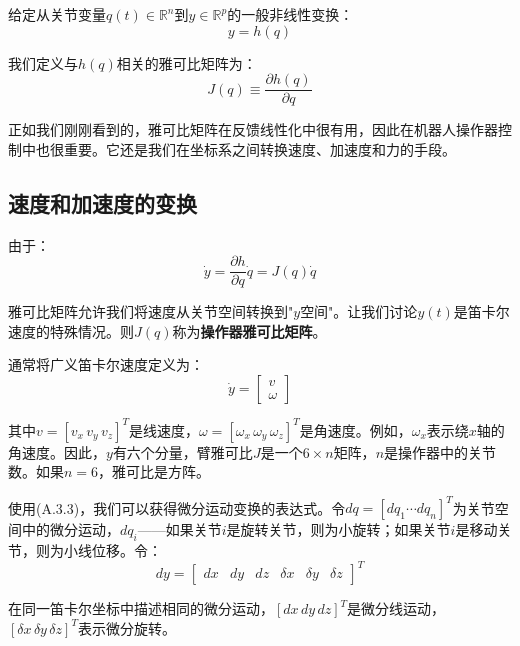 \documentclass[UTF8,a4paper]{ctexart}
\begin{document}
给定从关节变量$q(t) \in \mathbb{R}^n$到$y \in \mathbb{R}^p$的一般非线性变换：
\begin{equation}
y = h(q)
\tag{A.3.1}
\end{equation}

我们定义与$h(q)$相关的雅可比矩阵为：
\begin{equation}
J(q) \equiv \frac{\partial h(q)}{\partial q}
\tag{A.3.2}
\end{equation}

正如我们刚刚看到的，雅可比矩阵在反馈线性化中很有用，因此在机器人操作器控制中也很重要。它还是我们在坐标系之间转换速度、加速度和力的手段。

\subsection{速度和加速度的变换}

由于：
\begin{equation}
\dot{y} = \frac{\partial h}{\partial q}\dot{q} = J(q)\dot{q}
\tag{A.3.3}
\end{equation}

雅可比矩阵允许我们将速度从关节空间转换到"$y$空间"。让我们讨论$y(t)$是笛卡尔速度的特殊情况。则$J(q)$称为\textbf{操作器雅可比矩阵}。

通常将广义笛卡尔速度定义为：
\begin{equation}
\dot{y} = \begin{bmatrix} v \\ \omega \end{bmatrix}
\tag{A.3.4}
\end{equation}

其中$v = [v_x \, v_y \, v_z]^T$是线速度，$\omega = [\omega_x \, \omega_y \, \omega_z]^T$是角速度。例如，$\omega_x$表示绕$x$轴的角速度。因此，$y$有六个分量，臂雅可比$J$是一个$6 \times n$矩阵，$n$是操作器中的关节数。如果$n=6$，雅可比是方阵。

使用(A.3.3)，我们可以获得微分运动变换的表达式。令$dq = [dq_1 \cdots dq_n]^T$为关节空间中的微分运动，$dq_i$——如果关节$i$是旋转关节，则为小旋转；如果关节$i$是移动关节，则为小线位移。令：
\begin{equation}
dy = \begin{bmatrix} dx & dy & dz & \delta x & \delta y & \delta z \end{bmatrix}^T
\tag{A.3.5}
\end{equation}

在同一笛卡尔坐标中描述相同的微分运动，$[dx \, dy \, dz]^T$是微分线运动，$[\delta x \, \delta y \, \delta z]^T$表示微分旋转。
\end{document}
